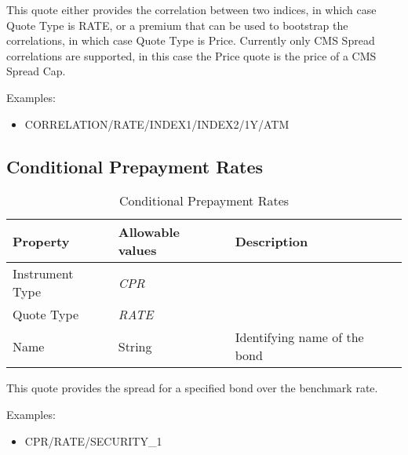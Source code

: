 This quote either provides the correlation between two indices, in which case Quote Type is RATE,
or a premium that can be used to bootstrap the correlations, in which case Quote Type is Price.
Currently only CMS Spread correlations are supported, in this case the Price quote is the price of a CMS Spread Cap.

\medskip
Examples:
\begin{itemize}
	\item CORRELATION/RATE/INDEX1/INDEX2/1Y/ATM
\end{itemize}
\subsection{Conditional Prepayment Rates}

\begin{table}[H]
\centering
  \begin{tabular}{|p{3cm}|p{3.5cm}|p{7cm}|}
  \hline
  {\bf Property} & {\bf Allowable values} & {\bf Description} \\ \hline
    Instrument Type & \emph{CPR} & \\ \hline
    Quote Type & \emph{RATE} & \\ \hline
    Name & String & Identifying name of the bond \\ \hline
  \end{tabular}
  \caption{Conditional Prepayment Rates}
  \label{tab:cpr_quote}
\end{table}

This quote provides the spread for a specified bond over the benchmark rate.

\medskip
Examples:
\begin{itemize}
	\item CPR/RATE/SECURITY\_1
\end{itemize}



